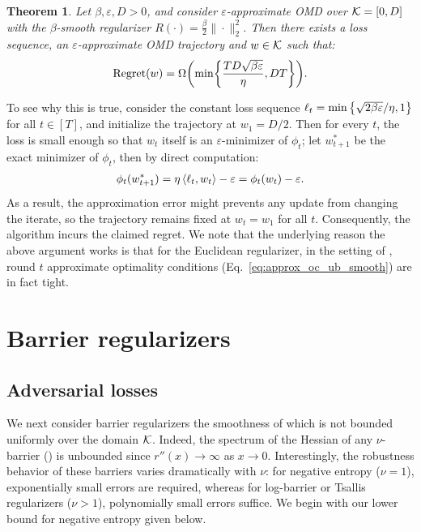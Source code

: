 \documentclass[10pt]{article}
\newtheorem{theorem}{Theorem}
\theoremstyle{definition}
\theoremstyle{remark}
\renewcommand{\epsilon}{\varepsilon}
\newcommand{\roundy}[1]{ {\left( #1 \right)}}
\newcommand{\barconst}{\nu}
\newcommand{\reg}{{\rm Regret}}
\begin{document}
\begin{theorem}
\label{thm:lb_smooth}
Let $\beta,\epsilon, D>0$, and consider $\epsilon$-approximate OMD
over $\mathcal K=[0, D]$ with the $\beta$-smooth regularizer $R(\cdot)=\frac\beta 2\|\cdot\|^2_2$.
Then there exists a loss sequence, 
an $\epsilon$-approximate OMD trajectory
and $w\in\mathcal K$ such that: 
\begin{align*}
    \reg(w) 
    =
    \Omega\roundy{\min\biggl\{ \frac{TD\sqrt{\beta\epsilon}}{\eta}, DT \biggr\} }
    .
\end{align*}
\end{theorem}

To see why this is true,
consider the constant loss sequence $\ell_t=\min\cbr[b]{\sqrt{2\beta\epsilon}/\eta, 1}$ for all $t\in[T]$, and initialize the trajectory at $w_1 = D/2$. Then for every $t$, the loss is small enough so that $w_t$ itself is an $\epsilon$-minimizer of $\phi_t$; 
let $w_{t+1}^*$ be the exact minimizer of $\phi_t$, 
then by direct computation: 
\begin{align*}
    \phi_t(w_{t+1}^*)
    = \eta \abr{\l_t, w_t}
    - \epsilon
    = \phi_t(w_t) - \epsilon.
\end{align*}
As a result, the approximation error might prevents any update from changing the iterate, so the trajectory remains fixed at $w_t = w_1$ for all $t$. Consequently, the algorithm incurs the claimed regret.
% 
We note that the underlying reason the above argument works is that for the Euclidean regularizer, in the setting of , round $t$ approximate optimality conditions (Eq.~\ref{eq:approx_oc_ub_smooth}) are in fact tight. 

\section{Barrier regularizers}\label{sec:barrier}
\subsection{Adversarial losses}\label{sec:barrier_adv}
% 
We next consider barrier regularizers the smoothness of which is not bounded uniformly over the domain $\mathcal K$. 
Indeed, the spectrum of the Hessian of any $\barconst$-barrier () is unbounded since $r''(x) \to \infty$ as $x \to 0$.
Interestingly, the robustness behavior of these barriers varies dramatically with $\barconst$: for negative entropy ($\barconst=1$), exponentially small errors are required, whereas for log-barrier or Tsallis regularizers ($\barconst>1$), polynomially small errors suffice. We begin with our lower bound for negative entropy given below.
\end{document}
